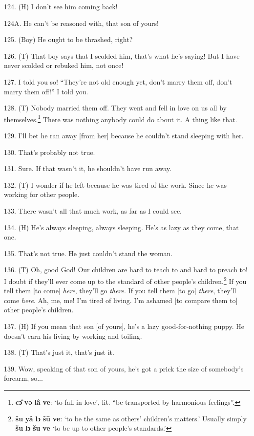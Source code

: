 124. (H) I don't see him coming back!

124A. He can't be reasoned with, that son of yours!

125. (Boy) He ought to be thrashed, right?

126. (T) That boy says that I scolded him, that's what he's saying! But I have
never scolded or rebuked him, not once!

127. I told you so! ``They're not old enough yet, don't marry them off,
don't marry them off!'' I told you.

128. (T) Nobody married them off. They went and fell in love on us all by themselves.\footnote{\textbf{cɔ̂} \textbf{və} \textbf{lâ} \textbf{ve}: `to fall in love', lit. ``be transported by harmonious feelings''.}
There was nothing anybody could do about it. A thing like that.

129. I'll bet he ran away [from her] because he couldn't stand sleeping with her.

130. That's probably not true.

131. Sure. If that wasn't it, he shouldn't have run away.

132. (T) I wonder if he left because he was tired of the work. Since he was working
for other people.

133. There wasn't all that much work, as far as I could see.

134. (H) He's always sleeping, always sleeping. He's as lazy as they come, that
one.

135. That's not true. He just couldn't stand the woman.

136. (T) Oh, good God! Our children are hard to teach to and hard to preach to!
I doubt if they'll ever come up to the standard of other people's children.\footnote{\textbf{šu} \textbf{yâ} \textbf{lɔ} \textbf{šū} \textbf{ve}: `to be the same as others' children's matters.' Usually simply \textbf{šu} \textbf{lɔ} \textbf{šū} \textbf{ve} `to be up to other people's standards.'}
If you tell them [to come] \textit{here}, they'll go \textit{there}. If you tell
them [to go] \textit{there}, they'll come \textit{here}. Ah, me, me! I'm tired
of living. I'm ashamed [to compare them to] other people's children.

137. (H) If you mean that son [of yours], he's a lazy good-for-nothing puppy. He
doesn't earn his living by working and toiling.

138. (T) That's just it, that's just it.

139. Wow, speaking of that son of yours, he's got a prick the size of somebody's
forearm, so...

